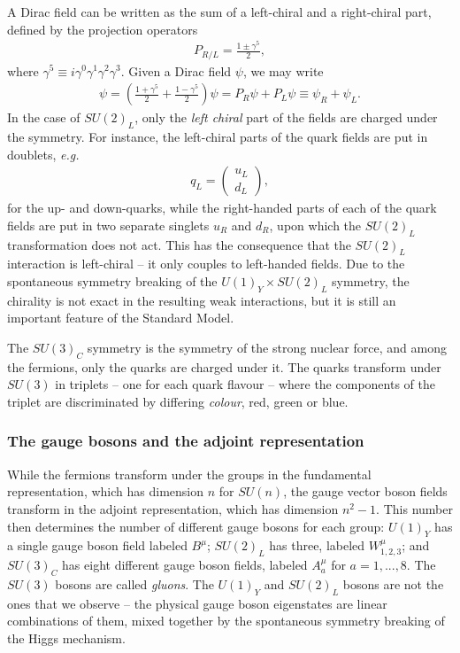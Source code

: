 A Dirac field can be written as the sum of a left-chiral and a right-chiral part, defined by the projection operators 
\begin{align}
	P_{R/L} = \frac{1\pm \gamma^5}{2},
\end{align}
where $\gamma^5 \equiv i\gamma^0\gamma^1\gamma^2\gamma^3$. Given a Dirac field $\psi$, we may write
\begin{align}
	\psi = \left( \frac{1 + \gamma^5}{2} + \frac{1 - \gamma^5}{2}\right)\psi = P_R \psi + P_L \psi \equiv \psi_R + \psi_L.
\end{align}
In the case of $SU(2)_L$, only the {\it left chiral} part of the fields are charged under the symmetry. For instance, the left-chiral parts of the quark fields are put in doublets, {\it e.g.}\
\begin{align}
	q_L = \begin{pmatrix}
		u_L \\ d_L
	\end{pmatrix},
\end{align}
for the up- and down-quarks, while the right-handed parts of each of the quark fields are put in two separate singlets $u_R$ and $d_R$, upon which the $SU(2)_L$ transformation does not act. This has the consequence that the $SU(2)_L$ interaction is left-chiral -- it only couples to left-handed fields. Due to the spontaneous symmetry breaking of the $U(1)_Y\times SU(2)_L$ symmetry, the chirality is not exact in the resulting weak interactions, but it is still an important feature of the Standard Model.

The $SU(3)_C$ symmetry is the symmetry of the strong nuclear force, and among the fermions, only the quarks are charged under it. The quarks transform under $SU(3)$ in triplets -- one for each quark flavour -- where the components of the triplet are discriminated by differing {\it colour}, red, green or blue. 

\subsubsection{The gauge bosons and the adjoint representation}

While the fermions transform under the groups in the fundamental representation, which has dimension $n$ for $SU(n)$, the gauge vector boson fields transform in the adjoint representation, which has dimension $n^2-1$. This number then determines the number of different gauge bosons for each group: $U(1)_Y$ has a single gauge boson field labeled $B^\mu$; $SU(2)_L$ has three, labeled $W^\mu_{1,2,3}$; and $SU(3)_C$ has eight different gauge boson fields, labeled $A^\mu_a$ for $a = 1,...,8$. The $SU(3)$ bosons are called {\it gluons}. The $U(1)_Y$ and $SU(2)_L$ bosons are not the ones that we observe -- the physical gauge boson eigenstates are linear combinations of them, mixed together by the spontaneous symmetry breaking of the Higgs mechanism.

